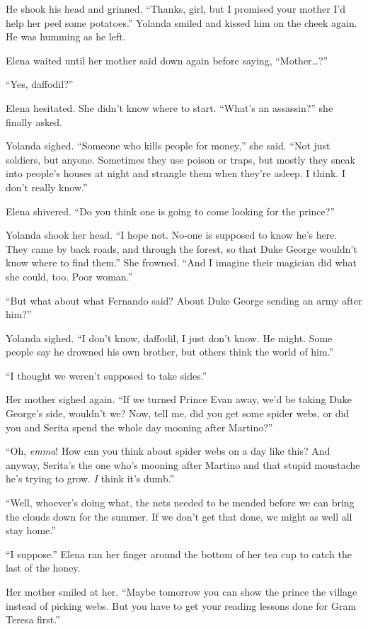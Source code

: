 \documentclass[10pt]{book}
\begin{document}
He shook his head and grinned. ``Thanks, girl, but I promised your mother I'd help her peel some potatoes.'' Yolanda smiled and kissed him on the cheek again. He was humming as he left.

Elena waited until her mother said down again before saying, ``Mother{\ldots}?''

``Yes, daffodil?''

Elena hesitated. She didn't know where to start. ``What's an assassin?'' she finally asked.

Yolanda sighed. ``Someone who kills people for money,'' she said. ``Not just soldiers, but anyone. Sometimes they use poison or traps, but mostly they sneak into people's houses at night and strangle them when they're asleep. I think. I don't really know.''

Elena shivered. ``Do you think one is going to come looking for the prince?''

Yolanda shook her head. ``I hope not. No-one is supposed to know he's here. They came by back roads, and through the forest, so that Duke George wouldn't know where to find them.'' She frowned. ``And I imagine their magician did what she could, too. Poor woman.''

``But what about what Fernando said? About Duke George sending an army after him?''

Yolanda sighed. ``I don't know, daffodil, I just don't know. He might. Some people say he drowned his own brother, but others think the world of him.''

``I thought we weren't supposed to take sides.''

Her mother sighed again. ``If we turned Prince Evan away, we'd be taking Duke George's side, wouldn't we? Now, tell me, did you get some spider webs, or did you and Serita spend the whole day mooning after Martino?''

``Oh, \emph{emma}! How can you think about spider webs on a day like this? And anyway, Serita's the one who's mooning after Martino and that stupid moustache he's trying to grow. \emph{I} think it's dumb.''

``Well, whoever's doing what, the nets needed to be mended before we can bring the clouds down for the summer. If we don't get that done, we might as well all stay home.''

``I suppose.'' Elena ran her finger around the bottom of her tea cup to catch the last of the honey.

Her mother smiled at her. ``Maybe tomorrow you can show the prince the village instead of picking webs. But you have to get your reading lessons done for Gram Teresa first.''
\end{document}
